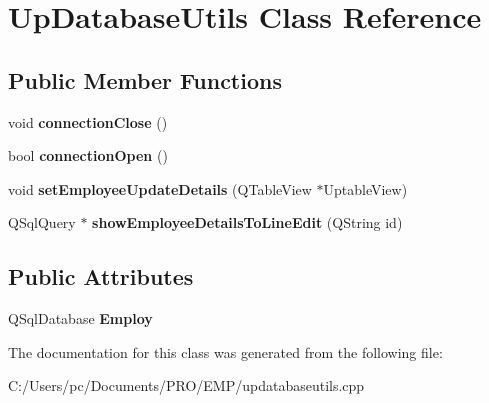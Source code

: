 \hypertarget{class_up_database_utils}{}\section{Up\+Database\+Utils Class Reference}
\label{class_up_database_utils}
\subsection*{Public Member Functions}
\begin{DoxyCompactItemize}
\item 
\mbox{\label{class_up_database_utils_a68c2dcea1af63cdb9c76449eb89204ec}} 
void {\bfseries connection\+Close} ()
\item 
\mbox{\label{class_up_database_utils_ac3e40dec44baf833c156920eebff6860}} 
bool {\bfseries connection\+Open} ()
\item 
\mbox{\label{class_up_database_utils_a3fd9951060f82141ac0b7096b2be330c}} 
void {\bfseries set\+Employee\+Update\+Details} (Q\+Table\+View $\ast$Uptable\+View)
\item 
\mbox{\label{class_up_database_utils_a21b16b7d0f438d1535f45b23ea5901dd}} 
Q\+Sql\+Query $\ast$ {\bfseries show\+Employee\+Details\+To\+Line\+Edit} (Q\+String id)
\end{DoxyCompactItemize}
\subsection*{Public Attributes}
\begin{DoxyCompactItemize}
\item 
\mbox{\label{class_up_database_utils_a7729ca29a54ab9865dac411503c3d5b3}} 
Q\+Sql\+Database {\bfseries Employ}
\end{DoxyCompactItemize}


The documentation for this class was generated from the following file\+:\begin{DoxyCompactItemize}
\item 
C\+:/\+Users/pc/\+Documents/\+P\+R\+O/\+E\+M\+P/updatabaseutils.\+cpp\end{DoxyCompactItemize}
